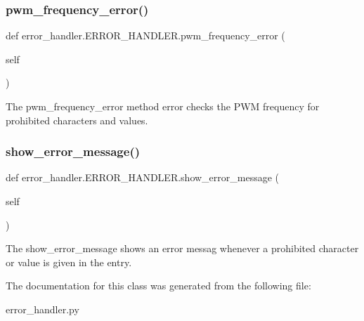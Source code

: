 \mbox{\label{classerror__handler_1_1ERROR__HANDLER_a99f49e4f104fb465f742f19b64686630}} 
\subsubsection{\texorpdfstring{pwm\+\_\+frequency\+\_\+error()}{pwm\_frequency\_error()}}
{\footnotesize\ttfamily def error\+\_\+handler.\+E\+R\+R\+O\+R\+\_\+\+H\+A\+N\+D\+L\+E\+R.\+pwm\+\_\+frequency\+\_\+error (\begin{DoxyParamCaption}\item[{}]{self }\end{DoxyParamCaption})}



The pwm\+\_\+frequency\+\_\+error method error checks the P\+WM frequency for prohibited characters and values. 

\mbox{\label{classerror__handler_1_1ERROR__HANDLER_ad71c2ba5b91d90294155fda388fd43bd}} 
\subsubsection{\texorpdfstring{show\+\_\+error\+\_\+message()}{show\_error\_message()}}
{\footnotesize\ttfamily def error\+\_\+handler.\+E\+R\+R\+O\+R\+\_\+\+H\+A\+N\+D\+L\+E\+R.\+show\+\_\+error\+\_\+message (\begin{DoxyParamCaption}\item[{}]{self }\end{DoxyParamCaption})}



The show\+\_\+error\+\_\+message shows an error messag whenever a prohibited character or value is given in the entry. 



The documentation for this class was generated from the following file\+:\begin{DoxyCompactItemize}
\item 
error\+\_\+handler.\+py\end{DoxyCompactItemize}
